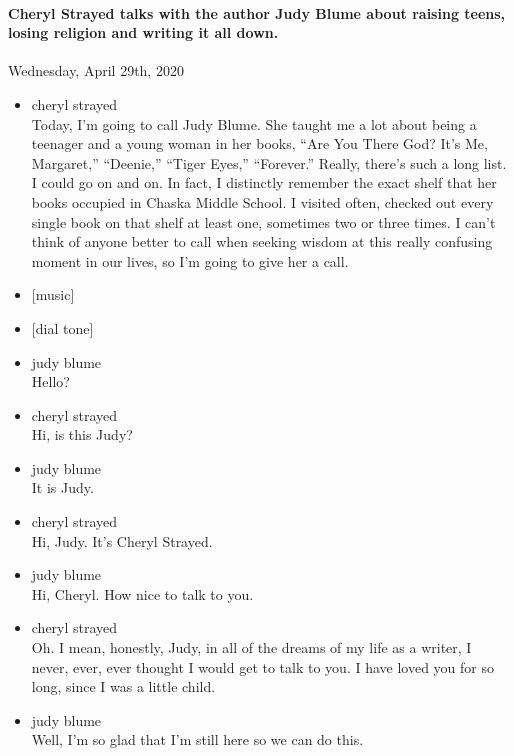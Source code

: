 \hypertarget{cheryl-strayed-talks-with-the-author-judy-blume-about-raising-teens-losing-religion-and-writing-it-all-down}{%
\paragraph{Cheryl Strayed talks with the author Judy Blume about raising
teens, losing religion and writing it all
down.}\label{cheryl-strayed-talks-with-the-author-judy-blume-about-raising-teens-losing-religion-and-writing-it-all-down}}

Wednesday, April 29th, 2020

\begin{itemize}
\item
  cheryl strayed\\
  Today, I'm going to call Judy Blume. She taught me a lot about being a
  teenager and a young woman in her books, ``Are You There God? It's Me,
  Margaret,'' ``Deenie,'' ``Tiger Eyes,'' ``Forever.'' Really, there's
  such a long list. I could go on and on. In fact, I distinctly remember
  the exact shelf that her books occupied in Chaska Middle School. I
  visited often, checked out every single book on that shelf at least
  one, sometimes two or three times. I can't think of anyone better to
  call when seeking wisdom at this really confusing moment in our lives,
  so I'm going to give her a call.
\item
  {[}music{]}
\item
  {[}dial tone{]}
\item
  judy blume\\
  Hello?
\item
  cheryl strayed\\
  Hi, is this Judy?
\item
  judy blume\\
  It is Judy.
\item
  cheryl strayed\\
  Hi, Judy. It's Cheryl Strayed.
\item
  judy blume\\
  Hi, Cheryl. How nice to talk to you.
\item
  cheryl strayed\\
  Oh. I mean, honestly, Judy, in all of the dreams of my life as a
  writer, I never, ever, ever thought I would get to talk to you. I have
  loved you for so long, since I was a little child.
\item
  judy blume\\
  Well, I'm so glad that I'm still here so we can do this.

\end{itemize}
